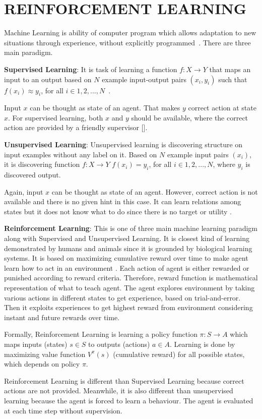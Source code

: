 \chapter{REINFORCEMENT LEARNING}

\label{chap:rl_chap}

Machine Learning is ability of computer program which allows adaptation to new situations through experience, without explicitly programmed~\cite{mitchell_machine_1997}. There are three main paradigm.

\textbf{Supervised Learning}: It is task of learning a function $f \colon X \rightarrow Y$ that maps an input to an output based on $N$ example input-output pairs $(x_i,y_i)$ such that $ f(x_i) \approx y_i$, for all $i \in {1,2,...,N} $~\cite{russell_artificial_nodate}.

Input $x$ can be thought as state of an agent. That makes $y$ correct action at state $x$. For supervised learning, both $x$ and $y$ should be available, where the correct action are provided by a friendly supervisor []. 

\textbf{Unsupervised Learning}:
Unsupervised learning is discovering structure on input examples without any label on it. Based on $N$ example input pairs $(x_i)$, it is discovering function $f \colon X \rightarrow Y$ $ f(x_i) = y_i$, for all $i \in {1,2,...,N} $, where $y_i$ is discovered output. 

Again, input $x$ can be thought as state of an agent. However, correct action is not available and there is no given hint in this case. It can learn relations among states but it does not know what to do since there is no target or utility \cite{russell_artificial_nodate}.

\textbf{Reinforcement Learning}: This is one of three main machine learning paradigm along with Supervised and Unsupervised Learning. It is closest kind of learning demonstrated by humans and animals since it is grounded by biological learning systems. It is based on maximizing cumulative reward over time to make agent learn how to act in an environment \cite{sutton_reinforcement_1998}. Each action of agent is either rewarded or punished according to reward criteria. Therefore, reward function is mathematical representation of what to teach agent. The agent explores environment by taking various actions in different states to get experience, based on trial-and-error. Then it exploits experiences to get highest reward from environment considering instant and future rewards over time. 

Formally, Reinforcement Learning is learning a policy function $\pi \colon S\rightarrow A$ which maps inputs (states) $s \in S$ to outputs (actions) $a \in A$. Learning is done by maximizing value function $V^{\pi}(s)$ (cumulative reward) for all possible states, which depends on policy $\pi$. 

Reinforcement Learning is different than Supervised Learning because correct actions are not provided. Meanwhile, it is also different than unsupervised learning because the agent is forced to learn a behaviour. The agent is evaluated at each time step without supervision.
